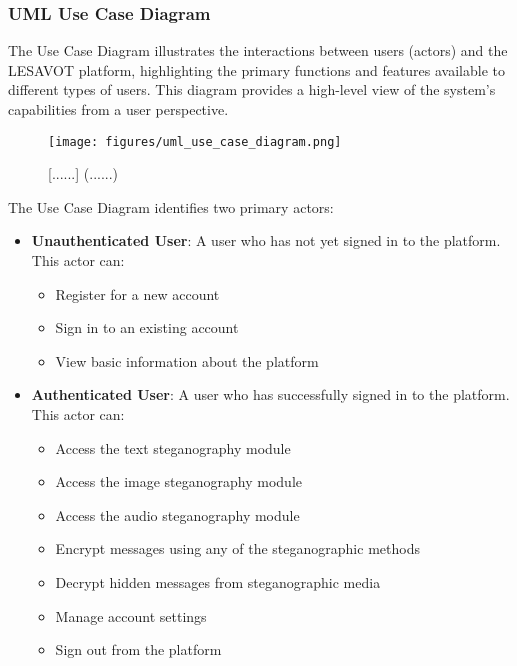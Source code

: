 \documentclass[12pt, a4paper, oneside]{book}
\begin{document}
\subsubsection{UML Use Case Diagram}

The Use Case Diagram illustrates the interactions between users (actors) and the LESAVOT platform, highlighting the primary functions and features available to different types of users. This diagram provides a high-level view of the system's capabilities from a user perspective.

\begin{figure}[htbp]
    \centering
    \texttt{[image: figures/uml\_use\_case\_diagram.png]}
    \caption{[......] (......)}
    \label{fig:use_case_diagram}
\end{figure}

The Use Case Diagram identifies two primary actors:

\begin{itemize}[leftmargin=*]
    \item \textbf{Unauthenticated User}: A user who has not yet signed in to the platform. This actor can:
    \begin{itemize}
        \item Register for a new account
        \item Sign in to an existing account
        \item View basic information about the platform
    \end{itemize}

    \item \textbf{Authenticated User}: A user who has successfully signed in to the platform. This actor can:
    \begin{itemize}
        \item Access the text steganography module
        \item Access the image steganography module
        \item Access the audio steganography module
        \item Encrypt messages using any of the steganographic methods
        \item Decrypt hidden messages from steganographic media
        \item Manage account settings
        \item Sign out from the platform
    \end{itemize}
\end{itemize}
\end{document}
